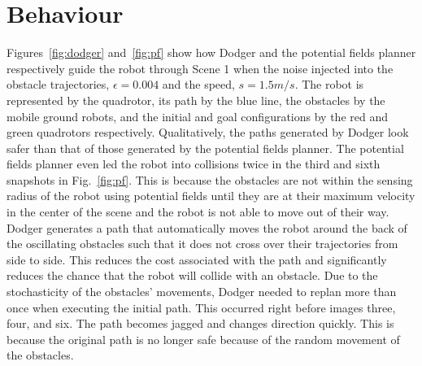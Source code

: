 \section{Behaviour}

Figures~\ref{fig:dodger} and~\ref{fig:pf} show how Dodger and the potential
fields planner respectively guide the robot through Scene 1 when the noise
injected into the obstacle trajectories, $\epsilon = 0.004$ and the speed, $s =
1.5 m/s$. The robot is represented by the quadrotor, its path by the blue line,
the obstacles by the mobile ground robots, and the initial and goal
configurations by the red and green quadrotors respectively. Qualitatively, the
paths generated by Dodger look safer than that of those generated by the
potential fields planner.  The potential fields planner even led the robot into
collisions twice in the third and sixth snapshots in Fig.~\ref{fig:pf}. This is
because the obstacles are not within the sensing radius of the robot using
potential fields until they are at their maximum velocity in the center of the
scene and the robot is not able to move out of their way. Dodger generates a
path that automatically moves the robot around the back of the oscillating
obstacles such that it does not cross over their trajectories from side to
side. This reduces the cost associated with the path and significantly reduces
the chance that the robot will collide with an obstacle. Due to the
stochasticity of the obstacles' movements, Dodger needed to replan more than
once when executing the initial path. This occurred right before images three,
four, and six. The path becomes jagged and changes direction quickly. This is
because the original path is no longer safe because of the random movement of
the obstacles.

